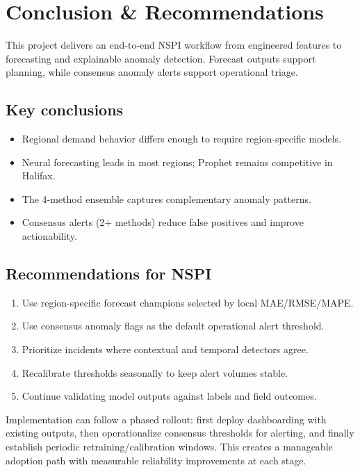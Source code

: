 \section{Conclusion \& Recommendations}

This project delivers an end-to-end NSPI workflow from engineered features to forecasting and explainable anomaly detection. Forecast outputs support planning, while consensus anomaly alerts support operational triage.

\subsection{Key conclusions}
\begin{itemize}
	\item Regional demand behavior differs enough to require region-specific models.
	\item Neural forecasting leads in most regions; Prophet remains competitive in Halifax.
	\item The 4-method ensemble captures complementary anomaly patterns.
	\item Consensus alerts (2+ methods) reduce false positives and improve actionability.
\end{itemize}

\subsection{Recommendations for NSPI}
\begin{enumerate}
	\item Use region-specific forecast champions selected by local MAE/RMSE/MAPE.
	\item Use consensus anomaly flags as the default operational alert threshold.
	\item Prioritize incidents where contextual and temporal detectors agree.
	\item Recalibrate thresholds seasonally to keep alert volumes stable.
	\item Continue validating model outputs against labels and field outcomes.
\end{enumerate}

Implementation can follow a phased rollout: first deploy dashboarding with existing outputs, then operationalize consensus thresholds for alerting, and finally establish periodic retraining/calibration windows. This creates a manageable adoption path with measurable reliability improvements at each stage.

